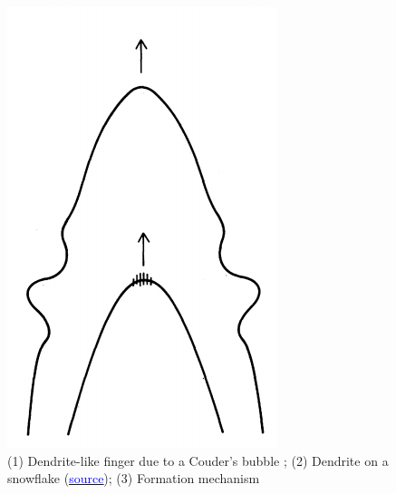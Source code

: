 \documentclass{beamer}
\begin{document}
\begin{frame}
\begin{figure}[!tbp]
\begin{minipage}[b]{0.3\textwidth}
    \end{minipage}
    \hspace{10pt}
    \begin{minipage}[b]{0.2\textwidth}
    \includegraphics[scale=0.35]{dendrite_1}
    \end{minipage}
    \caption{(1) Dendrite-like finger due to a Couder's bubble \cite{Dendrite}; (2) Dendrite on a snowflake (\href{https://www.its.caltech.edu/~atomic/snowcrystals/dendrites/dendrite.htm}{\underline{\textcolor{blue}{source}}}); (3) Formation mechanism \cite{Dendrite}}
    \label{fig:cells}
\end{figure}
\end{frame}
\end{document}
